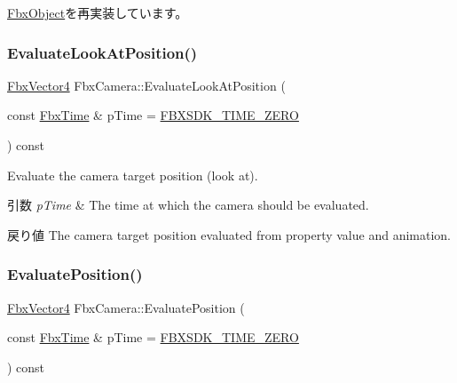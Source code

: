 \hyperlink{class_fbx_object_a0c0c5adb38284d14bb82c04d54504a3e}{Fbx\+Object}を再実装しています。

\mbox{\label{class_fbx_camera_ab165ef1a4608be94263afed2d2a61d77}} 
\subsubsection{\texorpdfstring{Evaluate\+Look\+At\+Position()}{EvaluateLookAtPosition()}}
{\footnotesize\ttfamily \hyperlink{class_fbx_vector4}{Fbx\+Vector4} Fbx\+Camera\+::\+Evaluate\+Look\+At\+Position (\begin{DoxyParamCaption}\item[{const \hyperlink{class_fbx_time}{Fbx\+Time} \&}]{p\+Time = {\ttfamily \hyperlink{fbxtime_8h_aa43cd11e74102affeac06402663d2653}{F\+B\+X\+S\+D\+K\+\_\+\+T\+I\+M\+E\+\_\+\+Z\+E\+RO}} }\end{DoxyParamCaption}) const}

Evaluate the camera target position (look at). 
\begin{DoxyParams}{引数}
{\em p\+Time} & The time at which the camera should be evaluated. \\
\hline
\end{DoxyParams}
\begin{DoxyReturn}{戻り値}
The camera target position evaluated from property value and animation. 
\end{DoxyReturn}
\mbox{\label{class_fbx_camera_ae52c55ed3e2bc5ba64d37e103155dcad}} 
\subsubsection{\texorpdfstring{Evaluate\+Position()}{EvaluatePosition()}}
{\footnotesize\ttfamily \hyperlink{class_fbx_vector4}{Fbx\+Vector4} Fbx\+Camera\+::\+Evaluate\+Position (\begin{DoxyParamCaption}\item[{const \hyperlink{class_fbx_time}{Fbx\+Time} \&}]{p\+Time = {\ttfamily \hyperlink{fbxtime_8h_aa43cd11e74102affeac06402663d2653}{F\+B\+X\+S\+D\+K\+\_\+\+T\+I\+M\+E\+\_\+\+Z\+E\+RO}} }\end{DoxyParamCaption}) const}

